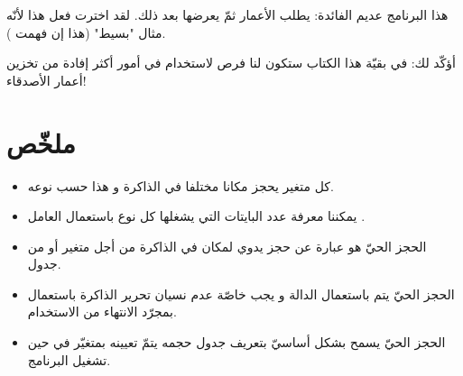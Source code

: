 هذا البرنامج عديم الفائدة: يطلب الأعمار ثمّ يعرضها بعد ذلك. لقد اخترت فعل هذا لأنّه مثال "بسيط" (هذا إن فهمت
).

أؤكّد لك: في بقيّة هذا الكتاب ستكون لنا فرص لاستخدام
في أمور أكثر إفادة من تخزين أعمار الأصدقاء!

\section*{ملخّص}

\begin{itemize}
  \item كل متغير يحجز مكانا مختلفا في الذاكرة و هذا حسب نوعه.
  \item يمكننا معرفة عدد البايتات التي يشغلها كل نوع باستعمال العامل .
  \item الحجز الحيّ هو عبارة عن حجز يدوي لمكان في الذاكرة من أجل متغير أو من جدول.
  \item الحجز الحيّ يتم باستعمال الدالة
و يجب خاصّة عدم نسيان تحرير الذاكرة باستعمال
بمجرّد الانتهاء من الاستخدام.
  \item الحجز الحيّ يسمح بشكل أساسيّ بتعريف جدول حجمه يتمّ تعيينه بمتغيّر في حين تشغيل البرنامج.
\end{itemize}
